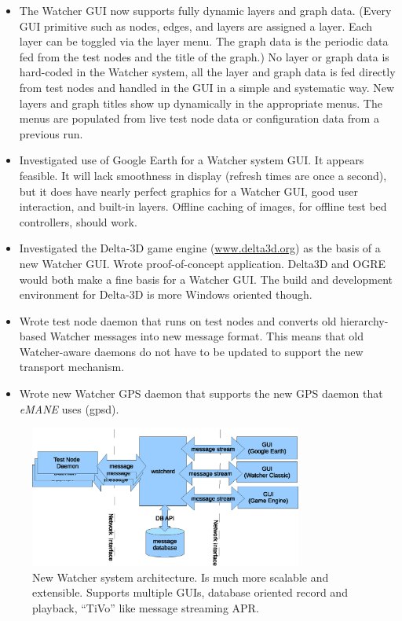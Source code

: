 \documentclass{report}
\begin{document}
\begin{itemize}
\item The Watcher GUI now supports fully dynamic layers and graph data. (Every GUI primitive such as nodes, edges, and layers are assigned a layer. Each layer can be
toggled via the layer menu. The graph data is the periodic data fed from the test nodes and the title of the graph.) No layer or graph data is hard-coded in the Watcher system, all 
the layer and graph data is fed directly from test nodes and handled in the GUI in a simple and systematic way. New layers and graph titles show up dynamically in the appropriate 
menus. The menus are populated from live test node data or configuration data from a previous run.
\item Investigated use of Google Earth for a Watcher system GUI. It appears feasible. It will lack smoothness in display (refresh times are once a second), but it 
does have nearly perfect graphics for a Watcher GUI, good user interaction, and built-in layers. Offline caching of images, for offline test bed controllers, should work. 
\item Investigated the Delta-3D game engine (\url{www.delta3d.org}) as the basis of a new Watcher GUI. Wrote proof-of-concept application. Delta3D and OGRE would both make 
a fine basis for a Watcher GUI. The build and development environment for Delta-3D is more Windows oriented though. 
\item Wrote test node daemon that runs on test nodes and converts old hierarchy-based Watcher messages into new message format. 
This means that old Watcher-aware daemons do not have to be updated to support the new transport mechanism.
\item Wrote new Watcher GPS daemon that supports the new GPS daemon that {\it eMANE} uses (gpsd). 
\end{itemize}

\begin{figure}[!b]
\centering
\includegraphics[width=0.8\textwidth]{watcherArch.eps}
\caption{New Watcher system architecture. Is much more scalable and extensible. Supports multiple GUIs, database oriented record and playback, ``TiVo'' like message streaming APR.} 
\label{fig:watcherArch}
\end{figure}
\end{document}
